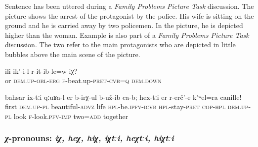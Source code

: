 Sentence  has been uttered during a \textit{Family Problems Picture Task} discussion. The picture shows the arrest of the protagonist by the police. His wife is sitting on the ground and he is carried away by two policemen. In the picture, he is depicted higher than the woman. Example  is also part of a \textit{Family Problems Picture Task} discussion. The two  refer to the main protagonists who are depicted in little bubbles above the main scene of the picture.
%
\begin{exe}
	\ex	\label{Or he did beat her?}
	\gll	ili	ik'-i-l	r-it-ib-le=w	iχ?\\
		or	\textsc{dem.up-obl-erg}	\textsc{f}-beat.up-\textsc{pret-cvb=q}	\textsc{dem.down}\\
	\glt	{}

	\ex	\label{It turns out that they lived well in the beginning. Look at them both together!}
	\gll	bahsar	ix-tːi	qːuʁa-l	er	b-irχ-ul	b-už-ib ca-b;	hex-tːi	er	r-erč'-e	k'ʷel=ra	canille!\\
		first	\textsc{dem.up}-\textsc{pl}	beautiful-\textsc{advz}	life	\textsc{hpl}-be.\textsc{ipfv}-\textsc{icvb}	\textsc{hpl}-stay-\textsc{pret} \textsc{cop-hpl}	\textsc{dem.up}-\textsc{pl}	look	\textsc{f}-look.\textsc{pfv-im}\textsc{p}	two=\textsc{add}	together\\
	\glt	{}
\end{exe}



\subsubsection{\textit{χ}-pronouns: \textit{iχ, heχ, hiχ, iχtːi, heχtːi, hiχtːi}}
\label{sssec:x-pronouns}

